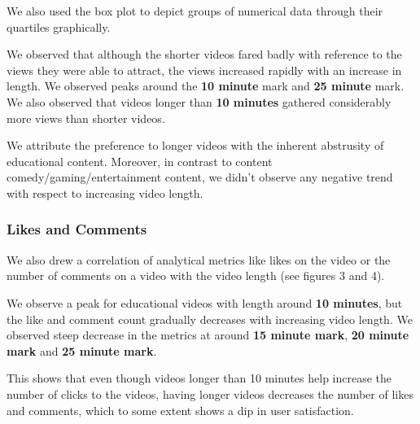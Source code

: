 \documentclass{article}
\begin{document}
\noindent We also used the box plot to depict groups of numerical data through their quartiles graphically.


\noindent We observed that although the shorter videos fared badly with reference to the views they were able to attract, the views increased rapidly with an increase in length. We observed peaks around the \textbf{10 minute} mark and  \textbf{25 minute} mark. We also observed that videos longer than \textbf{10 minutes} gathered considerably more views than shorter videos. 


We attribute the preference to longer videos with the inherent abstrusity of educational content. Moreover, in contrast to content comedy/gaming/entertainment content, we didn't observe any negative trend with respect to increasing video length. 

\subsubsection{Likes and Comments}
We also drew a correlation of analytical metrics like likes on the video or the number of comments on a video with the video length (see figures 3 and 4).

We observe a peak for educational videos with length around \textbf{10 minutes}, but the like and comment count gradually decreases with increasing video length. We observed steep decrease in the metrics at around \textbf{15 minute mark}, \textbf{20 minute mark} and \textbf{25 minute mark}.

This shows that even though videos longer than 10 minutes help increase the number of clicks to the videos, having longer videos decreases the number of likes and comments, which to some extent shows a dip in user satisfaction.
\end{document}
